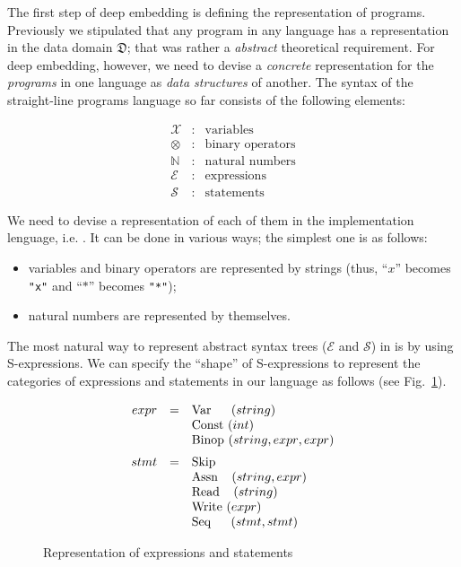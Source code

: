 The first step of deep embedding is defining the representation of programs. Previously we stipulated that any program in any language
has a representation in the data domain $\mathfrak D$; that was rather a \emph{abstract} theoretical requirement. For deep embedding,
however, we need to devise a \emph{concrete} representation for the \emph{programs} in one language as \emph{data structures} of another.
The syntax of the straight-line programs language so far consists of the following elements:

\[
\begin{array}{rcl}
  \mathscr{X} & : &\mbox{variables}\\
  \otimes     & : &\mbox{binary operators}\\
  \mathbb{N}  & : &\mbox{natural numbers}\\
  \mathscr{E} & : &\mbox{expressions}\\
  \mathscr{S} & : &\mbox{statements}
\end{array}
\]

We need to devise a representation of each of them in the implementation lenguage, i.e. \lama. It can be done in various ways;
the simplest one is as follows:

\begin{itemize}
\item variables and binary operators are represented by strings (thus, ``$x$'' becomes \lstinline|"x"| and ``$*$'' becomes \lstinline|"*"|);
\item natural numbers are represented by themselves.
\end{itemize}

The most natural way to represent abstract syntax trees ($\mathscr E$ and $\mathscr S$) in \lama is by using S-expressions. We can specify the
``shape'' of S-expressions to represent the categories of expressions and statements in our language as follows (see Fig.~\ref{expr-stmt-repr}).

\begin{figure}[h]
\[
\begin{array}{rcl}
  expr &=& \llang{Var$\;\;\;\;\;\:$($string$)}\\
       & & \llang{Const ($int$)}\\
       & & \llang{Binop ($string$, $\,expr$, $\,expr$)}\\[2mm]      
  stmt &=& \llang{Skip}\\
       & & \llang{Assn$\;\;\;\;$($string$, $\,expr$)}\\
       & & \llang{Read$\;\;\;\;$($string$)}\\
       & & \llang{Write ($expr$)}\\
       & & \llang{Seq$\quad\:\:\,$($stmt$, $\,stmt$)}
\end{array}
\]
\caption{Representation of expressions and statements}
\label{expr-stmt-repr}
\end{figure}

